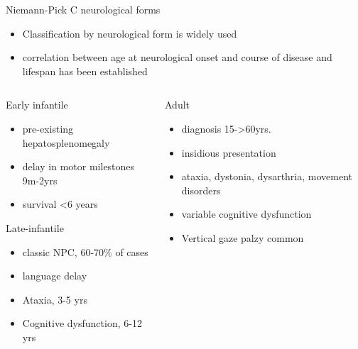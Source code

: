 \documentclass[presentation, smaller]{beamer}
\begin{document}
\begin{frame}[label={sec:orgheadline13}]{Niemann-Pick C neurological forms}
\small
\begin{itemize}
\item Classification by neurological form is widely used
\item correlation between age at neurological onset and course of disease
and lifespan has been established
\end{itemize}

\begin{columns}
\begin{column}{0.5\columnwidth}
\begin{block}{Early infantile}
\begin{itemize}
\item pre-existing hepatosplenomegaly
\item delay in motor milestones 9m-2yrs
\item survival <6 years
\end{itemize}
\end{block}

\begin{block}{Late-infantile}
\begin{itemize}
\item classic NPC, 60-70\% of cases
\item language delay
\item Ataxia, 3-5 yrs
\item Cognitive dysfunction, 6-12 yrs
\end{itemize}
\end{block}
\end{column}


\begin{column}{0.5\columnwidth}
\begin{block}{Adult}
\begin{itemize}
\item diagnosis 15->60yrs.
\item insidious presentation
\item ataxia, dystonia, dysarthria, movement disorders
\item variable cognitive dysfunction
\item Vertical gaze palzy common
\end{itemize}
\end{block}
\end{column}
\end{columns}
\end{frame}
\end{document}

